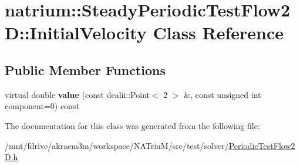 \hypertarget{classnatrium_1_1SteadyPeriodicTestFlow2D_1_1InitialVelocity}{
\section{natrium::SteadyPeriodicTestFlow2D::InitialVelocity Class Reference}
\label{classnatrium_1_1SteadyPeriodicTestFlow2D_1_1InitialVelocity}
}
\subsection*{Public Member Functions}
\begin{DoxyCompactItemize}
\item 
\hypertarget{classnatrium_1_1SteadyPeriodicTestFlow2D_1_1InitialVelocity_a414fbfc54a6a42629d5a804f157d5576}{
virtual double {\bfseries value} (const dealii::Point$<$ 2 $>$ \&, const unsigned int component=0) const }
\label{classnatrium_1_1SteadyPeriodicTestFlow2D_1_1InitialVelocity_a414fbfc54a6a42629d5a804f157d5576}

\end{DoxyCompactItemize}


The documentation for this class was generated from the following file:\begin{DoxyCompactItemize}
\item 
/mnt/fdrive/akraem3m/workspace/NATriuM/src/test/solver/\hyperlink{PeriodicTestFlow2D_8h}{PeriodicTestFlow2D.h}\end{DoxyCompactItemize}
